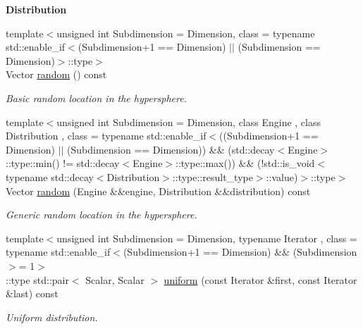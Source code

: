 \begin{Indent}{\bf Distribution}\par
\begin{DoxyCompactItemize}
\item 
{\footnotesize template$<$unsigned int Subdimension = Dimension, class  = typename std\-::enable\-\_\-if$<$(\-Subdimension+1 == Dimension) $|$$|$ (\-Subdimension == Dimension)$>$\-::type$>$ }\\Vector \hyperlink{classmagrathea_1_1AbstractHyperSphere_aaebbc45f113ae5a378fb3e66a6d6bd4b}{random} () const 
\begin{DoxyCompactList}\small\item\em Basic random location in the hypersphere. \end{DoxyCompactList}\item 
{\footnotesize template$<$unsigned int Subdimension = Dimension, class Engine , class Distribution , class  = typename std\-::enable\-\_\-if$<$((\-Subdimension+1 == Dimension) $|$$|$ (\-Subdimension == Dimension)) \&\& (std\-::decay$<$\-Engine$>$\-::type\-::min() != std\-::decay$<$\-Engine$>$\-::type\-::max()) \&\& (!std\-::is\-\_\-void$<$typename std\-::decay$<$\-Distribution$>$\-::type\-::result\-\_\-type$>$\-::value)$>$\-::type$>$ }\\Vector \hyperlink{classmagrathea_1_1AbstractHyperSphere_a0d9bbd4a3609ba5a1fe97cd3097a4fc3}{random} (Engine \&\&engine, Distribution \&\&distribution) const 
\begin{DoxyCompactList}\small\item\em Generic random location in the hypersphere. \end{DoxyCompactList}\item 
{\footnotesize template$<$unsigned int Subdimension = Dimension, typename Iterator , class  = typename std\-::enable\-\_\-if$<$(\-Subdimension+1 == Dimension) \&\& (\-Subdimension $>$= 1$>$ }\\\-::type std\-::pair$<$ Scalar, Scalar $>$ \hyperlink{classmagrathea_1_1AbstractHyperSphere_a98fd017fd23437d4ddcac5a2fbf30b60}{uniform} (const Iterator \&first, const Iterator \&last) const 
\begin{DoxyCompactList}\small\item\em Uniform distribution. \end{DoxyCompactList}\end{DoxyCompactItemize}
\end{Indent}
